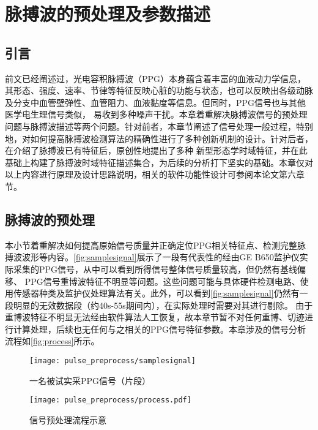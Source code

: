 \chapter{脉搏波的预处理及参数描述}
\section{引言}
前文已经阐述过，光电容积脉搏波（PPG）本身蕴含着丰富的血液动力学信息，其形态、强度、速率、节律等特征反映心脏的功能与状态，也可以反映出各级动脉及分支中血管壁弹性、血管阻力、血液黏度等信息。但同时，PPG信号也与其他医学电生理信号类似，
易收到多种噪声干扰。本章着重解决脉搏波信号的预处理问题与脉搏波描述等两个问题。针对前者，本章节阐述了信号处理一般过程，特别地，对如何提高脉搏波检测算法的精确性进行了多种创新机制的设计。针对后者，在介绍了脉搏波已有特征后，原创性地提出了多种
新型形态学时域特征，并在此基础上构建了脉搏波时域特征描述集合，为后续的分析打下坚实的基础。本章仅对以上内容进行原理及设计思路说明，相关的软件功能性设计可参阅本论文第六章节。
\section{脉搏波的预处理}
本小节着重解决如何提高原始信号质量并正确定位PPG相关特征点、检测完整脉搏波波形等内容。\autoref{fig:samplesignal}展示了一段有代表性的经由GE B650监护仪实际采集的PPG信号，从中可以看到所得信号整体信号质量较高，但仍然有基线偏移、
PPG信号重博波特征不明显等问题。这些问题可能与具体硬件检测电路、使用传感器种类及监护仪处理算法有关。此外，可以看到\autoref{fig:samplesignal}仍然有一段明显的无效数据段（约40s-55s期间内），在实际处理时需要对其进行剔除。
由于重博波特征不明显无法经由软件算法人工恢复，故本章节暂不对任何重博、切迹进行计算处理，后续也无任何与之相关的PPG信号特征参数。本章涉及的信号分析流程如\autoref{fig:process}所示。
\begin{figure}[htbp]
    \centering
    \texttt{[image: pulse\_preprocess/samplesignal]}
    \caption{\label{fig:samplesignal}一名被试实采PPG信号（片段）}
\end{figure}
\begin{figure}[htbp]
    \centering
    \texttt{[image: pulse\_preprocess/process.pdf]}
    \caption{\label{fig:process}信号预处理流程示意}
\end{figure}

